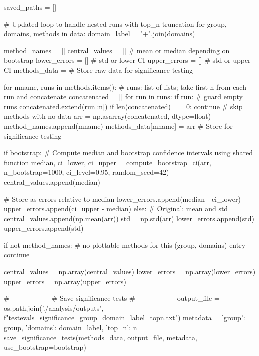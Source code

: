     saved_paths = []

    # Updated loop to handle nested runs with top_n truncation
    for group, domains, methods in data:
        domain_label = "+".join(domains)

        method_names = []
        central_values = []  # mean or median depending on bootstrap
        lower_errors = []    # std or lower CI
        upper_errors = []    # std or upper CI
        methods_data = {}    # Store raw data for significance testing

        for mname, runs in methods.items():
            # runs: list of lists; take first n from each run and concatenate
            concatenated = []
            for run in runs:
                if run:  # guard empty runs
                    concatenated.extend(run[:n])
            if len(concatenated) == 0:
                continue  # skip methods with no data
            arr = np.asarray(concatenated, dtype=float)
            method_names.append(mname)
            methods_data[mname] = arr  # Store for significance testing

            if bootstrap:
                # Compute median and bootstrap confidence intervals using shared function
                median, ci_lower, ci_upper = compute_bootstrap_ci(arr, n_bootstrap=1000, ci_level=0.95, random_seed=42)
                central_values.append(median)

                # Store as errors relative to median
                lower_errors.append(median - ci_lower)
                upper_errors.append(ci_upper - median)
            else:
                # Original: mean and std
                central_values.append(np.mean(arr))
                std = np.std(arr)
                lower_errors.append(std)
                upper_errors.append(std)

        if not method_names:
            # no plottable methods for this (group, domains) entry
            continue

        central_values = np.array(central_values)
        lower_errors = np.array(lower_errors)
        upper_errors = np.array(upper_errors)

        # ----------------
        # Save significance tests
        # ----------------
        output_file = os.path.join('./analysis/outputs', f"testevals_significance_{group}_{domain_label}_top{n}.txt")
        metadata = {
            'group': group,
            'domains': domain_label,
            'top_n': n
        }
        save_significance_tests(methods_data, output_file, metadata, use_bootstrap=bootstrap)

